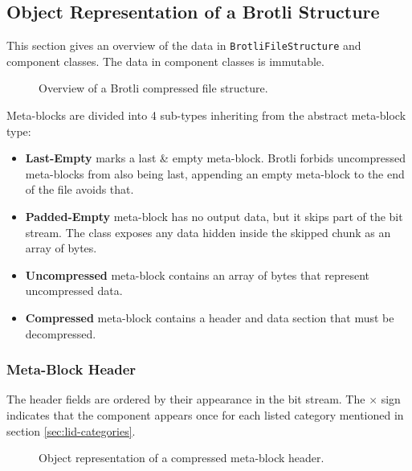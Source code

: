 \documentclass[english,master,dept460,male,cpp,cpdeclaration]{diploma}
\newcommand{\nosep}{\itemsep0em}
\newcommand{\texfigure}[1]{
}
\begin{document}
	\subsection{Object Representation of a Brotli Structure}
	
	This section gives an overview of the data in \verb|BrotliFileStructure| and component classes. The data in component classes is immutable.
	
	\begin{figure}[H]
		\centering
		\medskip
		\texfigure{object-representation-root}
		\caption{Overview of a Brotli compressed file structure.}
		\label{fig:bfs-root}
	\end{figure}
	
	
	\noindent
	Meta-blocks are divided into 4 sub-types inheriting from the abstract meta-block type:
	
	\begin{itemize} \nosep
		\item \textbf{Last-Empty} marks a last \& empty meta-block. Brotli forbids uncompressed meta-blocks from also being last, appending an empty meta-block to the end of the file avoids that.
		\item \textbf{Padded-Empty} meta-block has no output data, but it skips part of the bit stream. The class exposes any data hidden inside the skipped chunk as an array of bytes.
		\item \textbf{Uncompressed} meta-block contains an array of bytes that represent uncompressed data.
		\item \textbf{Compressed} meta-block contains a header and data section that must be decompressed.
	\end{itemize}
	
		\subsubsection{Meta-Block Header}
		
		The header fields are ordered by their appearance in the bit stream. The $\times$ sign indicates that the component appears once for each listed category mentioned in section \ref{sec:lid-categories}.
		
		\begin{figure}[H]
			\centering
			\medskip
			\texfigure{object-representation-meta-block-header}
			\caption{Object representation of a compressed meta-block header.}
			\label{fig:bfs-compressed-header}
		\end{figure}
		
\end{document}
